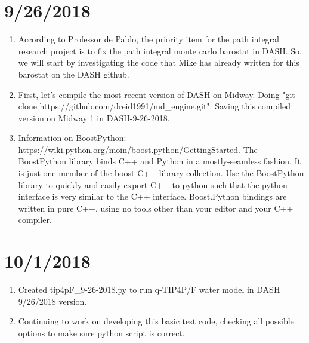 \documentclass[12pt,reqno]{amsart}
\numberwithin{equation}{section}
\begin{document}
\section{9/26/2018}
\begin{enumerate}
\item According to Professor de Pablo, the priority item for the path integral research project is to fix the path integral monte carlo barostat in DASH.  So, we will start by investigating the code that Mike has already written for this barostat on the DASH github.
\item First, let's compile the most recent version of DASH on Midway.  Doing "git clone https://github.com/dreid1991/md\_engine.git".  Saving this compiled version on Midway 1 in DASH-9-26-2018.  
\item Information on BoostPython: https://wiki.python.org/moin/boost.python/GettingStarted.  
\subitem The BoostPython library binds C++ and Python in a mostly-seamless fashion.  It is just one member of the boost C++ library collection.  Use the BoostPython library to quickly and easily export C++ to python such that the python interface is very similar to the C++ interface.  Boost.Python bindings are written in pure C++, using no tools other than your editor and your C++ compiler.  
\end{enumerate}

\section{10/1/2018}
\begin{enumerate}
\item Created tip4pF\_9-26-2018.py to run q-TIP4P/F water model in DASH 9/26/2018 version.  
\item Continuing to work on developing this basic test code, checking all possible options to make sure python script is correct.  
\end{enumerate}
\end{document}
